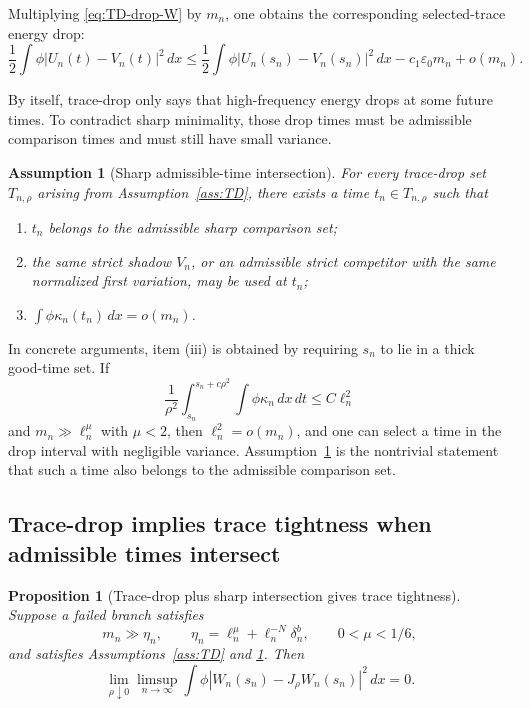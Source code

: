 \documentclass[11pt]{article}
\numberwithin{equation}{section}
\newtheorem{proposition}[theorem]{Proposition}
\newtheorem{assumption}[theorem]{Assumption}
\newcommand{\dx}{\,dx}
\newcommand{\dxdt}{\,dx\,dt}
\begin{document}
Multiplying \eqref{eq:TD-drop-W} by \(m_n\), one obtains the corresponding selected-trace energy drop:
\begin{equation}\label{eq:TD-drop-U}
\frac12\int\phi|U_n(t)-V_n(t)|^2\dx
\le
\frac12\int\phi|U_n(s_n)-V_n(s_n)|^2\dx
-c_1\varepsilon_0m_n+o(m_n).
\end{equation}

By itself, trace-drop only says that high-frequency energy drops at some future times.  To contradict sharp minimality, those drop times must be admissible comparison times and must still have small variance.

\begin{assumption}[Sharp admissible-time intersection]\label{ass:sharp-intersection}
For every trace-drop set \(T_{n,\rho}\) arising from Assumption~\ref{ass:TD}, there exists a time \(t_n\in T_{n,\rho}\) such that
\begin{enumerate}[label=(\roman*)]
\item \(t_n\) belongs to the admissible sharp comparison set;
\item the same strict shadow \(V_n\), or an admissible strict competitor with the same normalized first variation, may be used at \(t_n\);
\item \(\int\phi\kappa_n(t_n)\dx=o(m_n)\).
\end{enumerate}
\end{assumption}

In concrete arguments, item (iii) is obtained by requiring \(s_n\) to lie in a thick good-time set.  If
\[
\frac1{\rho^2}\int_{s_n}^{s_n+c\rho^2}\int\phi\kappa_n\dxdt\le C\ell_n^2
\]
and \(m_n\gg\ell_n^\mu\) with \(\mu<2\), then \(\ell_n^2=o(m_n)\), and one can select a time in the drop interval with negligible variance.  Assumption~\ref{ass:sharp-intersection} is the nontrivial statement that such a time also belongs to the admissible comparison set.

\subsection{Trace-drop implies trace tightness when admissible times intersect}

\begin{proposition}[Trace-drop plus sharp intersection gives trace tightness]\label{prop:TD-tightness}
Suppose a failed branch satisfies
\[
m_n\gg\eta_n,
\qquad
\eta_n=\ell_n^\mu+\ell_n^{-N}\delta_n^b,
\qquad
0<\mu<1/6,
\]
and satisfies Assumptions~\ref{ass:TD} and \ref{ass:sharp-intersection}.  Then
\begin{equation}\label{eq:trace-tightness-conclusion}
\lim_{\rho\downarrow0}\limsup_{n\to\infty}
\int\phi|W_n(s_n)-J_\rho W_n(s_n)|^2\dx=0.
\end{equation}
\end{proposition}
\end{document}
